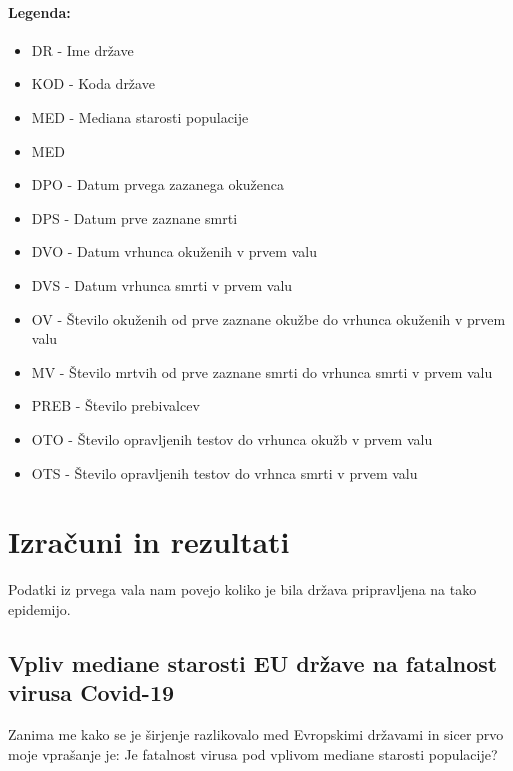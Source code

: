 \documentclass[a4paper,11pt]{article}
\begin{document}
\paragraph{Legenda:}

\begin{itemize}
\item{DR - Ime države}
\item{KOD - Koda države}
\item{MED - Mediana starosti populacije}
\item{MED}
\item{DPO - Datum prvega zazanega okuženca}
\item{DPS - Datum prve zaznane smrti}
\item{DVO - Datum vrhunca okuženih v prvem valu}
\item{DVS - Datum vrhunca smrti v prvem valu}
\item{OV - Število okuženih od prve zaznane okužbe do vrhunca okuženih v prvem valu}
\item{MV - Število mrtvih od prve zaznane smrti do vrhunca smrti v prvem valu}
\item{PREB - Število prebivalcev}
\item{OTO - Število opravljenih testov do vrhunca okužb v prvem valu}
\item{OTS - Število opravljenih testov do vrhnca smrti v prvem valu}
\end{itemize}

\section{Izračuni in rezultati}
Podatki iz prvega vala nam povejo koliko je bila država pripravljena na tako epidemijo.

\subsection{Vpliv mediane starosti EU države na fatalnost virusa Covid-19}
Zanima me kako se je širjenje razlikovalo med Evropskimi državami in sicer prvo moje vprašanje je: Je fatalnost virusa pod vplivom mediane starosti populacije?
\end{document}
